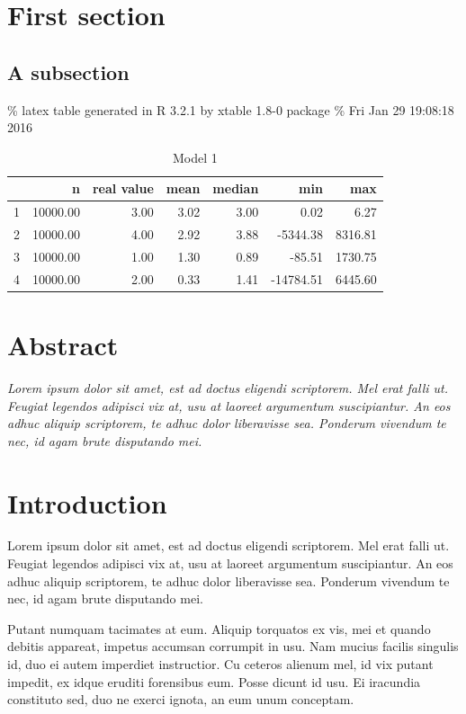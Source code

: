 \documentclass[]{article}
\begin{document}
\section{First section}

\subsection{A subsection}

\% latex table generated in R 3.2.1 by xtable 1.8-0 package \% Fri Jan
29 19:08:18 2016

\begin{table}[ht]
\centering
\begin{tabular}{rrrrrrr}
  \hline
 & n & real value & mean & median & min & max \\ 
  \hline
1 & 10000.00 & 3.00 & 3.02 & 3.00 & 0.02 & 6.27 \\ 
  2 & 10000.00 & 4.00 & 2.92 & 3.88 & -5344.38 & 8316.81 \\ 
  3 & 10000.00 & 1.00 & 1.30 & 0.89 & -85.51 & 1730.75 \\ 
  4 & 10000.00 & 2.00 & 0.33 & 1.41 & -14784.51 & 6445.60 \\ 
   \hline
\end{tabular}
\caption{Model 1}
\end{table}

\newpage

\section{Abstract}\label{abstract}

\emph{Lorem ipsum dolor sit amet, est ad doctus eligendi scriptorem. Mel
erat falli ut. Feugiat legendos adipisci vix at, usu at laoreet
argumentum suscipiantur. An eos adhuc aliquip scriptorem, te adhuc dolor
liberavisse sea. Ponderum vivendum te nec, id agam brute disputando
mei.}

\section{Introduction}\label{introduction-1}

Lorem ipsum dolor sit amet, est ad doctus eligendi scriptorem. Mel erat
falli ut. Feugiat legendos adipisci vix at, usu at laoreet argumentum
suscipiantur. An eos adhuc aliquip scriptorem, te adhuc dolor
liberavisse sea. Ponderum vivendum te nec, id agam brute disputando mei.

Putant numquam tacimates at eum. Aliquip torquatos ex vis, mei et quando
debitis appareat, impetus accumsan corrumpit in usu. Nam mucius facilis
singulis id, duo ei autem imperdiet instructior. Cu ceteros alienum mel,
id vix putant impedit, ex idque eruditi forensibus eum. Posse dicunt id
usu. Ei iracundia constituto sed, duo ne exerci ignota, an eum unum
conceptam.
\end{document}
